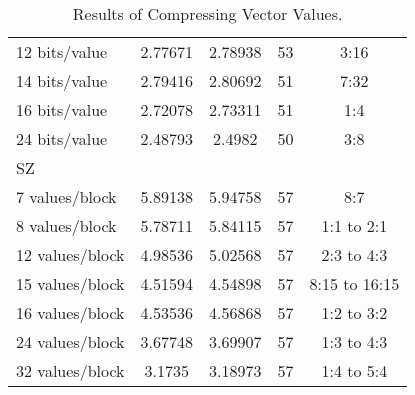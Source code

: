 \begin{table}
\begin{tabular}{l|S[table-format=2.6]|S[table-format=2.6]|r|c}
			\hspace{6mm} 12 bits/value & 2.77671 & 2.78938 & 53 & 3:16 \\
			\hspace{6mm} 14 bits/value & 2.79416 & 2.80692 & 51 & 7:32\\
			\hspace{6mm} 16 bits/value & 2.72078 & 2.73311 & 51 & 1:4 \\
			\hspace{6mm} 24 bits/value & 2.48793 & 2.4982 & 50 & 3:8 \\ 
		SZ & & & & \\
		\hspace{3mm} 7 values/block & 5.89138 & 5.94758 & 57 & 8:7 \\
		\hspace{3mm} 8 values/block & 5.78711 & 5.84115 & 57 & 1:1 to 2:1 \\
		\hspace{3mm} 12 values/block & 4.98536 & 5.02568 & 57 & 2:3 to 4:3 \\
		\hspace{3mm} 15 values/block & 4.51594 & 4.54898 & 57 & 8:15 to 16:15 \\
		\hspace{3mm} 16 values/block & 4.53536 & 4.56868 & 57 & 1:2 to 3:2 \\
		\hspace{3mm} 24 values/block & 3.67748 & 3.69907 & 57 & 1:3 to 4:3\\
		\hspace{3mm} 32 values/block & 3.1735 & 3.18973 & 57 & 1:4 to 5:4\\
	\end{tabular}
	\caption{Results of Compressing Vector Values.}
	\label{tab:results-vec}
\end{table}
